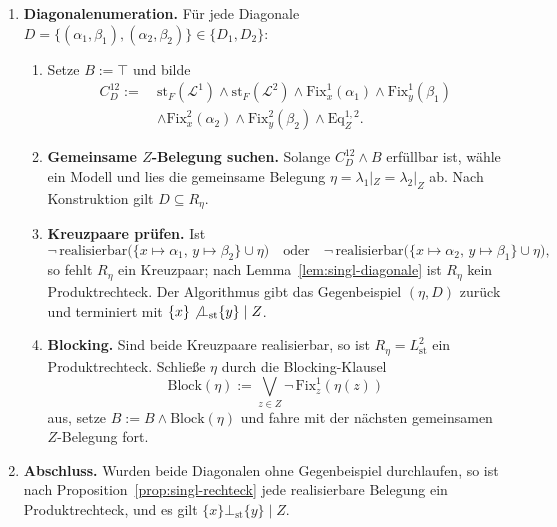 \begin{enumerate}
    \item \textbf{Diagonalenumeration.} Für jede Diagonale
    \(D=\{(\alpha_1,\beta_1),(\alpha_2,\beta_2)\}\in\{D_1,D_2\}\):
    \begin{enumerate}
        \item Setze \(B:=\top\) und bilde
        \[
        \begin{aligned}
            C^{12}_{D}
            :=\ &
            \mathrm{st}_F(\mathcal L^1)\land\mathrm{st}_F(\mathcal L^2)
            \land\mathrm{Fix}^1_x(\alpha_1)\land\mathrm{Fix}^1_y(\beta_1)\\
            &\land\mathrm{Fix}^2_x(\alpha_2)\land\mathrm{Fix}^2_y(\beta_2)
            \land\mathrm{Eq}^{1,2}_Z.
        \end{aligned}
        \]
        \item \textbf{Gemeinsame \(Z\)-Belegung suchen.} Solange
        \(C^{12}_{D}\land B\) erfüllbar ist, wähle ein Modell und lies die
        gemeinsame Belegung \(\eta=\lambda_1|_Z=\lambda_2|_Z\) ab. Nach
        Konstruktion gilt \(D\subseteq R_\eta\).
        \item \textbf{Kreuzpaare prüfen.} Ist
        \[
            \neg\,\mathrm{realisierbar}\bigl(\{x\mapsto\alpha_1,\,y\mapsto\beta_2\}\cup\eta\bigr)
            \quad\text{oder}\quad
            \neg\,\mathrm{realisierbar}\bigl(\{x\mapsto\alpha_2,\,y\mapsto\beta_1\}\cup\eta\bigr),
        \]
        so fehlt \(R_\eta\) ein Kreuzpaar; nach
        Lemma~\ref{lem:singl-diagonale} ist \(R_\eta\) kein Produktrechteck.
        Der Algorithmus gibt das Gegenbeispiel \((\eta,D)\) zurück und
        terminiert mit \(\{x\}\not\bot_{\mathrm{st}}\{y\}\mid Z\).
        \item \textbf{Blocking.} Sind beide Kreuzpaare realisierbar, so ist
        \(R_\eta=L_{\mathrm{st}}^2\) ein Produktrechteck. Schließe \(\eta\)
        durch die Blocking-Klausel
        \[
            \mathrm{Block}(\eta):=\bigvee_{z\in Z}\neg\,\mathrm{Fix}^1_z(\eta(z))
        \]
        aus, setze \(B:=B\land\mathrm{Block}(\eta)\) und fahre mit der
        nächsten gemeinsamen \(Z\)-Belegung fort.
    \end{enumerate}

    \item \textbf{Abschluss.} Wurden beide Diagonalen ohne Gegenbeispiel
    durchlaufen, so ist nach Proposition~\ref{prop:singl-rechteck} jede
    realisierbare Belegung ein Produktrechteck, und es gilt
    \(\{x\}\bot_{\mathrm{st}}\{y\}\mid Z\).
\end{enumerate}

